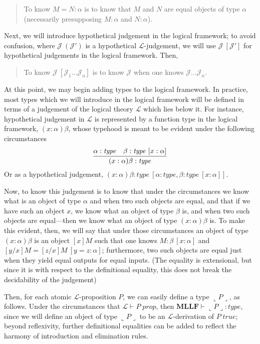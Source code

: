 \documentclass{amsart}
\theoremstyle{definition}
\theoremstyle{remark}
\numberwithin{equation}{section}
\newcommand\isprop[1]{\ensuremath{#1\;\mathit{prop}}}
\newcommand\istrue[1]{\ensuremath{#1\;\mathit{true}}}
\newcommand\hyp[2]{\ensuremath{#1\ (#2)}}
\newcommand\lfhyp[2]{\ensuremath{#1\ [#2]}}
\newcommand\MLLF{\textbf{MLLF}}
\newcommand\type[1]{\ensuremath{#1:\mathit{type}}}
\begin{document}
\begin{quote}
  To know $M=N:\alpha$ is to know that $M$ and $N$ are equal objects of type
  $\alpha$ (necessarily presupposing $M:\alpha$ and $N:\alpha$).
\end{quote}

Next, we will introduce hypothetical judgement in the logical framework; to
avoid confusion, where \hyp{\mathcal{J}}{\mathcal{J}'} is a hypothetical
$\mathcal{L}$-judgement, we will use \lfhyp{\mathcal{J}}{\mathcal{J}'} for
hypothetical judgements in the logical framework. Then,

\begin{quote}
  To know \lfhyp{\mathcal{J}}{\mathcal{J}_1\dots\mathcal{J}_n} is to know $\mathcal{J}$ when one knows $\mathcal{J}...\mathcal{J}_n$.
\end{quote}

At this point, we may begin adding types to the logical framework. In practice,
most types which we will introduce in the logical framework will be defined in
terms of a judgement of the logical theory $\mathcal{L}$ which lies below it.
For instance, hypothetical judgement in $\mathcal{L}$ is represented by a
function type in the logical framework, $(x:\alpha)\beta$, whose typehood is
meant to be evident under the following circumstances
\[
  \infer{
    \type{(x:\alpha)\beta}
  }{
    \type\alpha &
    \lfhyp{\type\beta}{x:\alpha}
  }
\]
Or as a hypothetical judgement,
\lfhyp{\type{(x:\alpha)\beta}}{\type\alpha,\lfhyp{\type\beta}{x:\alpha}}.

Now, to know this judgement is to know that under the circumstances we know
what is an object of type $\alpha$ and when two such objects are equal, and
that if we have such an object $x$, we know what an object of type $\beta$ is,
and when two such objects are equal---then we know what an object of type
$(x:\alpha)\beta$ is. To make this evident, then, we will say that under those
circumstances an object of type $(x:\alpha)\beta$ is an object $[x]M$ such that
one knows \lfhyp{M:\beta}{x:\alpha} and \lfhyp{[y/x]M=[z/x]M}{y=z:\alpha};
furthermore, two such objects are equal just when they yield equal outputs for
equal inputs. (The equality is extensional, but since it is with respect to the
definitional equality, this does not break the decidability of the judgement)

Then, for each atomic $\mathcal{L}$-proposition $P$, we can easily define a
type $\llcorner P\lrcorner$, as follows. Under the circumstances that
$\mathcal{L}\vdash\isprop{P}$, then $\MLLF\vdash\type{\llcorner P\lrcorner}$,
since we will define an object of type $\llcorner P\lrcorner$ to be an
$\mathcal{L}$-derivation of \istrue{P}; beyond reflexivity, further
definitional equalities can be added to reflect the harmony of introduction and
elimination rules.
\end{document}
